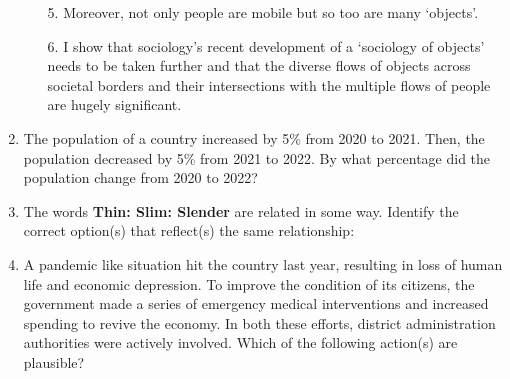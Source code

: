 \documentclass[12pt]{article}
\theoremstyle{remark}
\begin{document}
\begin{enumerate}
\begin{enumerate}
\item[5.] Moreover, not only people are mobile but so too are many ‘objects’.
\item[6.] I show that sociology’s recent development of a ‘sociology of objects’ needs to be taken further and that the diverse flows of objects across societal borders and their intersections with the multiple flows of people are hugely significant.
\end{enumerate}
\begin{enumerate}
\end{enumerate}
\hfill{}
\item The population of a country increased by 5\% from 2020 to 2021. Then, the
population decreased by 5\% from 2021 to 2022. By what percentage did the
population change from 2020 to 2022?
\begin{enumerate}
\end{enumerate}
\hfill{}
\item The words \textbf{Thin: Slim: Slender} are related in some way.
Identify the correct option(s) that reflect(s) the same relationship:
\begin{enumerate}
\end{enumerate}
\hfill{}
\item A pandemic like situation hit the country last year, resulting in loss of human life and economic depression. To improve the condition of its citizens, the government made a series of emergency medical interventions and increased spending to revive the economy. In both these efforts, district administration authorities were actively involved. Which of the following action(s) are plausible?

\end{enumerate}
\end{document}
